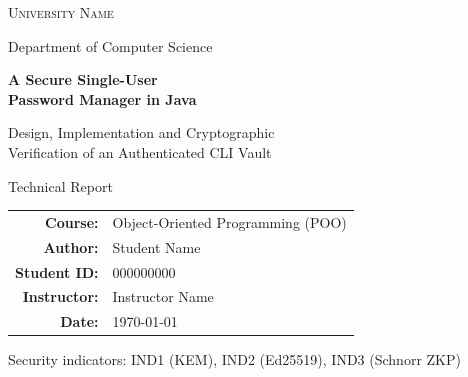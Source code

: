 \documentclass[11pt,a4paper]{article}
\begin{document}
\begin{titlepage}
\centering
\vspace*{1.8cm}

{\Large\scshape University Name\par}
\vspace{0.4cm}
{\large Department of Computer Science\par}

\vspace{2.4cm}
{\Huge\bfseries A Secure Single-User\\[0.35cm] Password Manager in Java\par}

\vspace{0.9cm}
{\Large Design, Implementation and Cryptographic\\[0.2cm]
Verification of an Authenticated CLI Vault\par}

\vspace{1.4cm}
{\large Technical Report\par}

\vspace{1.8cm}
\begin{tabular}{rl}
\textbf{Course:}      & Object-Oriented Programming (POO)\\[2pt]
\textbf{Author:}      & Student Name\\[2pt]
\textbf{Student ID:}  & 000000000\\[2pt]
\textbf{Instructor:}  & Instructor Name\\[2pt]
\textbf{Date:}        & \today\\
\end{tabular}

\vfill
{\small Security indicators: IND1 (KEM), IND2 (Ed25519), IND3 (Schnorr ZKP)\par}
\end{titlepage}
\end{document}
